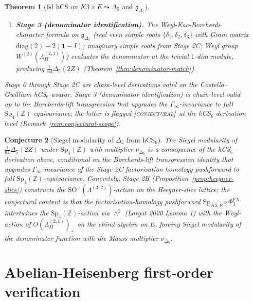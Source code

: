 \documentclass[11pt]{amsart}
\providecommand{\Z}{\mathbb{Z}}
\providecommand{\HB}{\Lambda^{(2,1)}_{I\!I}}
\providecommand{\LamF}{\Lambda^{(3,2)}}
\providecommand{\Gdelta}{\mathfrak{g}_{\Delta_{5}}}
\providecommand{\PhiFA}{\Phi^{\mathrm{FA}}}
\providecommand{\SpF}{\mathrm{Sp}}
\providecommand{\ClaimStatusConjectured}{\textsc{[conjectural]}}
\theoremstyle{plain}
\newtheorem{theorem}{Theorem}[section]
\newtheorem{conjecture}[theorem]{Conjecture}
\theoremstyle{definition}
\theoremstyle{remark}
\begin{document}
\begin{theorem}[$6$d hCS on $K3\times E\leadsto \Delta_{5}$ and $\Gdelta$]
\begin{enumerate}
\item[(D)] \textbf{Stage 3 (denominator identification).}
The Weyl-Kac-Borcherds character formula on $\Gdelta$
(real even simple roots $\{\delta_{1},\delta_{2},\delta_{3}\}$
with Gram matrix $\mathrm{diag}(2)-2(\mathbf{1}-I)$; imaginary simple
roots from Stage 2C; Weyl group $W^{(2)}(\HB)$) evaluates the
denominator at the trivial $1$-dim module, producing
$\tfrac{1}{64}\Delta_{5}(2Z)$ (Theorem~\ref{thm:denominator-match}).
\end{enumerate}

Stage 0 through Stage 2C are chain-level derivations valid on the
Costello--Gwilliam hCS$_{6}$-avatar. Stage 3 (denominator identification)
is chain-level valid up to the Borcherds-lift transgression that
upgrades the $\Gamma_{\infty}$-invariance to full $\mathrm{Sp}_{4}(\Z)
$-equivariance; the latter is flagged \ClaimStatusConjectured\ at the
hCS$_{6}$-derivation level (Remark~\ref{rem:conjectural-scope}).
\end{theorem}

\begin{conjecture}[Siegel modularity of $\Delta_{5}$ from hCS$_{6}$]
\label{conj:siegel-modularity}
The Siegel modularity of $\tfrac{1}{64}\Delta_{5}(2Z)$ under
$\mathrm{Sp}_{4}(\Z)$ with multiplier $\nu_{\Delta_{5}}$ is a
\emph{consequence} of the hCS$_{6}$-derivation above,
conditional on the Borcherds-lift transgression identity that
upgrades $\Gamma_{\infty}$-invariance of the Stage 2C factorisation-homology
pushforward to full $\mathrm{Sp}_{4}(\Z)$-equivariance. Concretely:
Stage 2B (Proposition~\ref{prop:heegner-slice}) constructs the
$\mathrm{SO}^{+}(\LamF)$-action on the Heegner-slice lattice; the
conjectural content is that the factorisation-homology pushforward
$\SpF_{K3, E}\circ \PhiFA_{3}$ intertwines the
$\mathrm{Sp}_{4}(\Z)$-action via $\wedge^{2}$ (Lorgat 2020 Lemma 1) with
the Weyl-action of $O(\HB)_{+}$ on the chiral-algebra on $E$, forcing
Siegel modularity of the denominator function with the Maass multiplier
$\nu_{\Delta_{5}}$.
\end{conjecture}

\section{Abelian-Heisenberg first-order verification}
\end{document}
